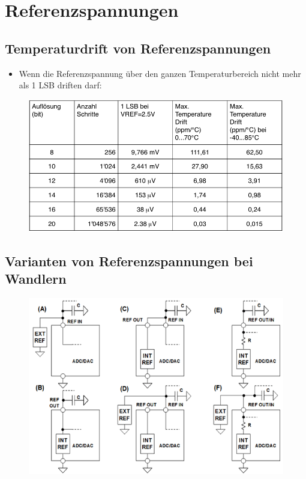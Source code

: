 \section{Referenzspannungen} 

\subsection{Temperaturdrift von Referenzspannungen}
\begin{itemize}
  \item Wenn die Referenzspannung über den ganzen Temperaturbereich nicht mehr
  als 1 LSB driften darf:
\end{itemize}
\begin{figure}[!htbp]
\includegraphics[scale=0.5]{pictures/temperaturdrift}
\end{figure}
\subsection{Varianten von Referenzspannungen bei Wandlern}
\begin{figure}[!h]
\includegraphics[scale=0.3]{pictures/variantenReferenzspannungen}
\end{figure}


